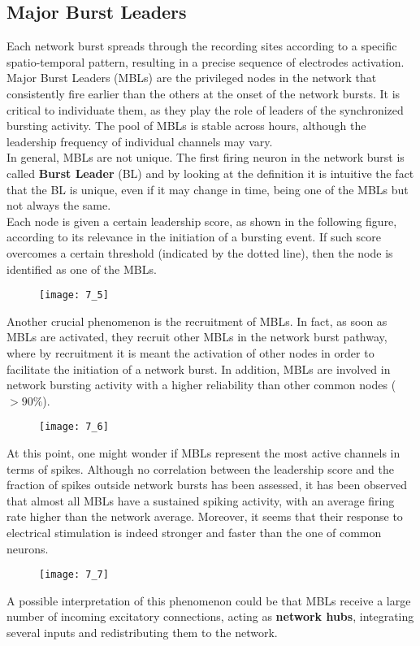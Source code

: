 \subsection{Major Burst Leaders}
Each network burst spreads through the recording sites according to a specific
spatio-temporal pattern, resulting in a precise sequence of electrodes activation.
Major Burst Leaders (MBLs) are the privileged nodes in the network that consistently
fire earlier than the others at the onset of the network bursts. It is critical to
individuate them, as they play the role of leaders of the synchronized bursting
activity. The pool of MBLs is stable across hours, although the leadership frequency
of individual channels may vary.\\
In general, MBLs are not unique. The first firing neuron in the network burst is called
\textbf{Burst Leader} (BL) and by looking at the definition it is intuitive the fact
that the BL is unique, even if it may change in time, being one of the MBLs but not
always the same.\\
Each node is given a certain leadership score, as shown in the following figure,
according to its relevance in the initiation of a bursting event. If such score
overcomes a certain threshold (indicated by the dotted line), then the node is
identified as one of the MBLs.
\begin{figure}[H]
    \texttt{[image: 7\_5]}
    \centering
\end{figure}
Another crucial phenomenon is the recruitment of MBLs. In fact, as soon as MBLs are
activated, they recruit other MBLs in the network burst pathway, where by recruitment
it is meant the activation of other nodes in order to facilitate the initiation of a
network burst. In addition, MBLs are involved in network bursting activity with a
higher reliability than other common nodes (\(>90\%\)).
\begin{figure}[H]
    \texttt{[image: 7\_6]}
    \centering
\end{figure}
At this point, one might wonder if MBLs represent the most active channels in terms
of spikes. Although no correlation between the leadership score and the fraction of
spikes outside network bursts has been assessed, it has been observed that almost
all MBLs have a sustained spiking activity, with an average firing rate higher than
the network average. Moreover, it seems that their response to electrical stimulation
is indeed stronger and faster than the one of common neurons.
\begin{figure}[H]
    \texttt{[image: 7\_7]}
    \centering
\end{figure}
A possible interpretation of this phenomenon could be that MBLs receive a large number
of incoming excitatory connections, acting as \textbf{network hubs}, integrating
several inputs and redistributing them to the network.
